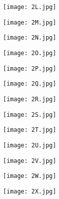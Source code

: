 \documentclass[11pt]{article}
\begin{document}
\begin{figure}[H]
    \centering
    \texttt{[image: 2L.jpg]}
\end{figure}

\begin{figure}[H]
    \centering
    \texttt{[image: 2M.jpg]}
\end{figure}

\begin{figure}[H]
    \centering
    \texttt{[image: 2N.jpg]}
\end{figure}

\begin{figure}[H]
    \centering
    \texttt{[image: 2O.jpg]}
\end{figure}

\begin{figure}[H]
    \centering
    \texttt{[image: 2P.jpg]}
\end{figure}
  
\begin{figure}[H]
    \centering
    \texttt{[image: 2Q.jpg]}
\end{figure}

\begin{figure}[H]
    \centering
    \texttt{[image: 2R.jpg]}
\end{figure}

\begin{figure}[H]
    \centering
    \texttt{[image: 2S.jpg]}
\end{figure}

\begin{figure}[H]
    \centering
    \texttt{[image: 2T.jpg]}
\end{figure}

\begin{figure}[H]
    \centering
    \texttt{[image: 2U.jpg]}
\end{figure}

\begin{figure}[H]
    \centering
    \texttt{[image: 2V.jpg]}
\end{figure}

\begin{figure}[H]
    \centering
    \texttt{[image: 2W.jpg]}
\end{figure}

\begin{figure}[H]
    \centering
    \texttt{[image: 2X.jpg]}
\end{figure}
\end{document}
